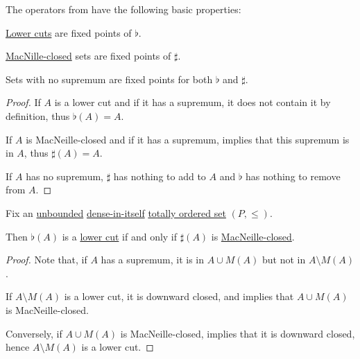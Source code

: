 \begin{proposition}\label{thm:def:lower_cut_closure}
  The operators from  have the following basic properties:
  \begin{thmenum}
     \hyperref[def:lower_cut]{Lower cuts} are fixed points of \( \flat \).

     \hyperref[def:macnielle_closure]{MacNille-closed} sets are fixed points of \( \sharp \).

     Sets with no supremum are fixed points for both \( \flat \) and \( \sharp \).
  \end{thmenum}
\end{proposition}
\begin{proof}
   If \( A \) is a lower cut and if it has a supremum, it does not contain it by definition, thus \( \flat(A) = A \).

   If \( A \) is MacNeille-closed and if it has a supremum,  implies that this supremum is in \( A \), thus \( \sharp(A) = A \).

   If \( A \) has no supremum, \( \sharp \) has nothing to add to \( A \) and \( \flat \) has nothing to remove from \( A \).
\end{proof}

\begin{proposition}\label{thm:lower_cut_characterization}
  Fix an \hyperref[def:extremal_points/bounds]{unbounded} \hyperref[def:dense_total_order]{dense-in-itself} \hyperref[def:totally_ordered_set]{totally ordered set} \( (P, \leq) \).

  Then \( \flat(A) \) is a \hyperref[def:lower_cut]{lower cut} if and only if \( \sharp(A) \) is \hyperref[def:macnielle_closure]{MacNeille-closed}.
\end{proposition}
\begin{proof}
  Note that, if \( A \) has a supremum, it is in \( A \cup M(A) \) but not in \( A \setminus M(A) \).

  \SufficiencySubProof If \( A \setminus M(A) \) is a lower cut, it is downward closed, and  implies that \( A \cup M(A) \) is MacNeille-closed.

  \NecessitySubProof Conversely, if \( A \cup M(A) \) is MacNeille-closed,  implies that it is downward closed, hence \( A \setminus M(A) \) is a lower cut.
\end{proof}

